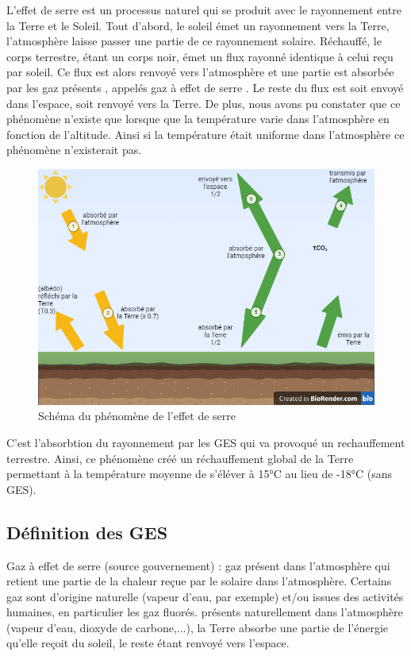\documentclass[a4paper, 12pt]{report} %
\begin{document}
L’effet de serre est un processus naturel qui se produit avec le rayonnement 
entre la Terre et le Soleil. Tout d'abord, le soleil émet un rayonnement vers la Terre, 
l'atmosphère laisse passer une partie de ce rayonnement solaire. Réchauffé, le corps terrestre, 
étant un corps noir, émet un flux rayonné identique à celui reçu par soleil. Ce flux est 
alors renvoyé vers l'atmosphère et une partie est absorbée par les gaz présents , appelés 
gaz à effet de serre . Le reste du flux est soit envoyé dans l'espace, soit renvoyé vers la Terre. 
De plus, nous avons pu constater que ce phénomène n'existe que lorsque que la température varie 
dans l'atmosphère en fonction de l'altitude. Ainsi si la température était uniforme dans 
l'atmosphère ce phénomène n'existerait pas. 
\begin{figure}[!ht]
\centering
\includegraphics[width=15cm]{Images/schemaflux.png}
      \caption{Schéma du phénomène de l'effet de serre}   
\end{figure}

C'est l'absorbtion du rayonnement par les GES qui va provoqué un rechauffement terrestre. 
Ainsi, ce phénomène créé un réchauffement global de la Terre permettant à la température 
moyenne de s'éléver à 15°C au lieu de -18°C (sans GES).    

\subsection{Définition des GES}
Gaz à effet de serre (source gouvernement) : gaz présent dans l’atmosphère qui retient une 
partie de la chaleur reçue par le solaire dans l’atmosphère. Certains gaz sont d’origine 
naturelle (vapeur d’eau, par exemple) et/ou issues des activités humaines, en particulier les gaz fluorés.
présents naturellement dans l’atmosphère (vapeur d’eau, dioxyde de carbone,...), la Terre absorbe une 
partie de l’énergie qu’elle reçoit du soleil, le reste étant renvoyé vers l’espace. \vspace{\baselineskip}
\end{document}

